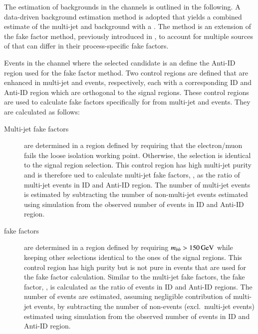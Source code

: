 The estimation of \jettotauhadvis backgrounds in the \lephad channels
is outlined in the following. A data-driven background estimation
method is adopted that yields a combined estimate of the multi-jet and
\ttbar background with a \faketauhadvis. The method is an extension of
the fake factor method, previously introduced in
, to account for multiple sources of
\faketauhadvis that can differ in their process-specific fake factors.

Events in the \lephad channel where the selected \tauhadvis candidate
is an \antitau define the Anti-ID region used for the fake factor
method. Two control regions are defined that are enhanced in multi-jet
and \ttbar events, respectively, each with a corresponding ID and
Anti-ID region which are orthogonal to the signal regions. These
control regions are used to calculate fake factors specifically for
\faketauhadvis from multi-jet and \ttbar events. They are calculated
as follows:
\begin{description}

\item[Multi-jet fake factors] are determined in a region defined by
  requiring that the electron/muon fails the loose isolation working
  point. Otherwise, the selection is identical to the \lephad signal
  region selection. This control region has high multi-jet purity and
  is therefore ued to calculate multi-jet fake factors, \FFqcd, as the
  ratio of multi-jet events in ID and Anti-ID region. The number of
  multi-jet events is estimated by subtracting the number of
  non-multi-jet events estimated using simulation from the observed
  number of events in ID and Anti-ID region.

\item[\ttbar fake factors] are determined in a region defined by
  requiring $m_{bb} > \SI{150}{\ensuremath{\text{GeV}}}$ while keeping other selections
  identical to the ones of the \lephad signal regions. This control
  region has high \ttbar purity but is not pure in \ttbarFakes events
  that are used for the fake factor calculation. Similar to the
  multi-jet fake factors, the \ttbar fake factor, \FFttbar, is
  calculated as the ratio of \ttbarFakes events in ID and Anti-ID
  regions. The number of \ttbarFakes events are estimated, assuming
  negligible contribution of multi-jet events, by subtracting the
  number of non-\ttbarFakes events (excl.\ multi-jet events) estimated
  using simulation from the observed number of events in ID and
  Anti-ID region.
\end{description}

